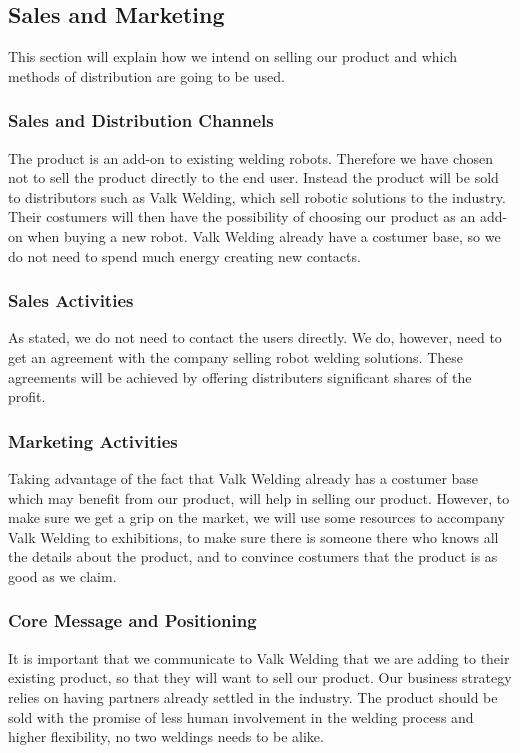 \subsection{Sales and Marketing}
This section will explain how we intend on selling our product and which methods of distribution are going to be used.
\subsubsection{Sales and Distribution Channels}
The product is an add-on to existing welding robots. Therefore we have chosen not to sell the product directly to the end user. 
Instead the product will be sold to distributors such as Valk Welding, which sell robotic solutions to the industry. 
Their costumers will then have the possibility of choosing our product as an add-on when buying a new robot.
Valk Welding already have a costumer base, so we do not need to spend much energy creating new contacts. 
\subsubsection{Sales Activities}
As stated, we do not need to contact the users directly. 
We do, however, need to get an agreement with the company selling robot welding solutions.
These agreements will be achieved by offering distributers significant shares of the profit.
\subsubsection{Marketing Activities}
Taking advantage of the fact that Valk Welding already has a costumer base which may benefit from our product, will help in selling our product.
However, to make sure we get a grip on the market, we will use some resources to accompany Valk Welding to exhibitions, to make sure there is someone there who knows all the details about the product, and to convince costumers that the product is as good as we claim. 
\subsubsection{Core Message and Positioning}
It is important that we communicate to Valk Welding that we are adding to their existing product, so that they will want to sell our product. Our business strategy relies on having partners already settled in the industry.
The product should be sold with the promise of less human involvement in the welding process and higher flexibility, no two weldings needs to be alike.
